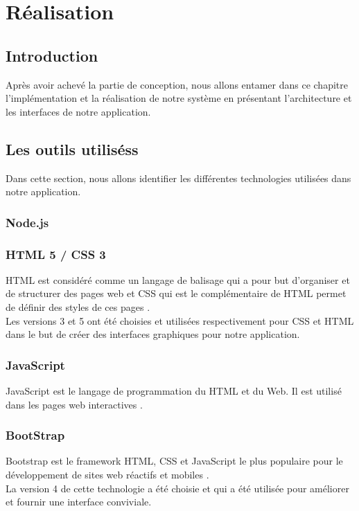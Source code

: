\chapter{Réalisation}
	
\section*{Introduction}
   Après avoir achevé la partie de conception, nous allons entamer dans ce chapitre l’implémentation et la réalisation de notre système en présentant l'architecture et les interfaces de notre application.

\section{Les outils utiliséss}
Dans cette section, nous allons identifier les différentes technologies utilisées dans notre application.


\subsection{Node.js}


\subsection{HTML 5 / CSS 3}
HTML est considéré comme un langage de balisage qui a pour but d'organiser et de structurer des pages web et CSS qui est le complémentaire de HTML permet de définir des styles de ces pages \cite{HTMLCSS}.\\
Les versions 3 et 5 ont été choisies et utilisées respectivement pour CSS et HTML dans le but de créer des interfaces graphiques pour notre application.   
\subsection{JavaScript}                 
JavaScript est le langage de programmation du HTML et du Web. Il est utilisé dans les pages web interactives \cite{JavaScript}.                
\subsection{BootStrap}
Bootstrap est le framework HTML, CSS et JavaScript le plus populaire pour le développement de sites web réactifs et mobiles \cite{BootStrap}.\\
La version 4 de cette technologie a été choisie et qui a été utilisée pour améliorer et fournir une interface conviviale.
\newpage
